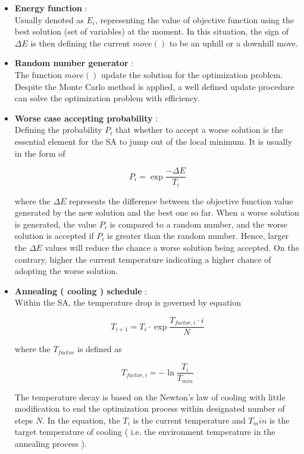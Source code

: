 \begin{itemize}

    \item \textbf{Energy function} : \\
        Usually denoted as $E_i$, representing the value of objective function using the best solution (set of variables) at the moment. In this situation, the sign of $\Delta E$ is then defining the current $move()$ to be an uphill or a downhill move.
        
    \item \textbf{Random number generator} :\\
        The function $move()$ update the solution for the optimization problem. Despite the Monte Carlo method is applied, a well defined update procedure can solve the optimization problem with efficiency.
        
    \item \textbf{Worse case accepting probability} :\\ 
        Defining the probability $P_i$ that whether to accept a worse solution is the essential element for the \ac{SA} to jump out of the local minimum. It is usually in the form of
        
        \begin{equation}
             P_i = \exp{\frac{- \Delta E}{T_i}}
        \label{eq:SA_tempDrop}
        \end{equation}
    
        where the $\Delta E$ represents the difference between the objective function value generated by the new solution and the best one so far. When a worse solution is generated, the value $P_i$ is compared to a random number, and the worse solution is accepted if $P_i$ is greater than the random number. Hence, larger the $\Delta E$ values will reduce the chance a worse solution being accepted. On the contrary, higher the current temperature indicating a higher chance of adopting the worse solution.
    
    \item \textbf{Annealing ( cooling ) schedule} : \\
        Within the \ac{SA}, the temperature drop is governed by equation

        \begin{equation}
             T_{i+1} = T_{i} \cdot \exp{\frac{T_{factor, i} \cdot i}{N}}
        \label{eq:SA_tempDrop}
        \end{equation}

        where the $T_{factor}$ is defined as

        \begin{equation}
            T_{factor, i} = - \ln{\frac{T_{i}}{T_{min}}}
        \label{eq:SA_tFactor}
        \end{equation}

        The temperature decay is based on the Newton's law of cooling with little modification to end the optimization process within designated number of steps $N$. In the equation, the $T_i$ is the current temperature and $T_min$ is the target temperature of cooling ( i.e. the environment temperature in the annealing process ). 
\end{itemize}

